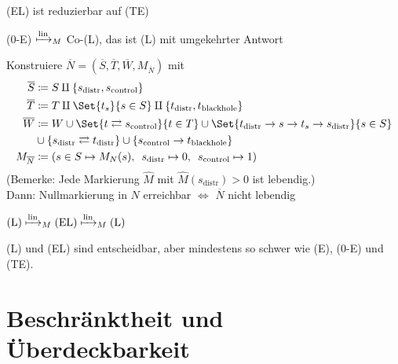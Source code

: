 \documentclass{cheat-sheet}
\newcommand{\reducesManyOneToLin}{\xmapsto{\mathrm{lin}}_M} %
\begin{document}
\begin{satz}
  (EL) ist reduzierbar auf (TE)
\end{satz}


\begin{satz}
  (0-E) $\reducesManyOneToLin$ Co-(L), das ist (L) mit umgekehrter Antwort
\end{satz}

\begin{beweis}
  Konstruiere $\overline{N} = (\overline{S}, \overline{T}, \overline{W}, M_{\overline{N}})$ mit
  \begin{align*}
    \overline{S} & \coloneqq S \amalg \{ s_\mathrm{distr}, s_\mathrm{control} \} \\
    \overline{T} & \coloneqq T \amalg \Set{t_s}{s \in S} \amalg \{ t_\mathrm{distr}, t_\mathrm{blackhole} \} \\
    \overline{W} & \coloneqq W \cup \Set{t \rightleftarrows s_\mathrm{control}}{t \in T} \cup \Set{t_\mathrm{distr} \to s \to t_s \to s_\mathrm{distr}}{s \in S} \\
    & \cup \{ s_\mathrm{distr} \rightleftarrows t_\mathrm{distr} \} \cup \{ s_\mathrm{control} \to t_\mathrm{blackhole} \} \\
    M_{\overline{N}} & \coloneqq (s \in S \mapsto M_N(s), \enspace s_\mathrm{distr} \mapsto 0, \enspace s_\mathrm{control} \mapsto 1)
  \end{align*}
  (Bemerke: Jede Markierung $\hat{M}$ mit $\hat{M}(s_\mathrm{distr}) > 0$ ist lebendig.) \\
  Dann: Nullmarkierung in $N$ erreichbar $\iff$ $\overline{N}$ nicht lebendig
\end{beweis}

\begin{satz}
  $\text{(L)} \reducesManyOneToLin \text{(EL)} \reducesManyOneToLin \text{(L)}$
\end{satz}


\begin{fazit}
  (L) und (EL) sind entscheidbar, aber mindestens so schwer wie (E), (0-E) und (TE).
\end{fazit}

\section{Beschränktheit und Überdeckbarkeit}
\end{document}
